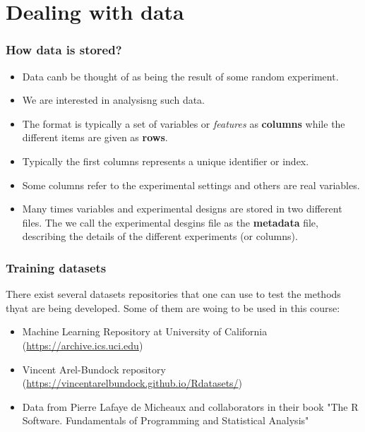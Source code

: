 \documentclass{beamer}
\begin{document}
\section{Dealing with data} %



\begin{frame}
\frametitle{How data is stored?}
\begin{itemize}
  \item Data canb be thought of as being the result of some random experiment.
  \item We are interested in analysisng such data.
  \item The format is typically a set of variables or {\em features} as {\bf columns} while the different items are given as {\bf rows}.
  \item Typically the first columns represents a unique identifier or index.
  \item Some columns refer to the experimental settings and others are real variables.
  \item Many times variables and experimental designs are stored in two different files. The we call the experimental desgins file as the {\bf metadata} file, describing the details of the different experiments (or columns).  
\end{itemize}
\end{frame}


\begin{frame}
\frametitle{Training datasets}
There exist several datasets repositories that one can use to test the methods thyat are being developed. Some of them are woing to be used in this course:
\begin{itemize}
\item Machine Learning Repository at University of California (\url{https://archive.ics.uci.edu})
\item Vincent Arel-Bundock repository (\url{https://vincentarelbundock.github.io/Rdatasets/})
\item Data from Pierre Lafaye de Micheaux and collaborators in their book  "The R Software. Fundamentals of Programming and Statistical Analysis" \cite{lafaye_de_micheaux_r_2013}
\end{itemize}
\end{frame}
\end{document}

